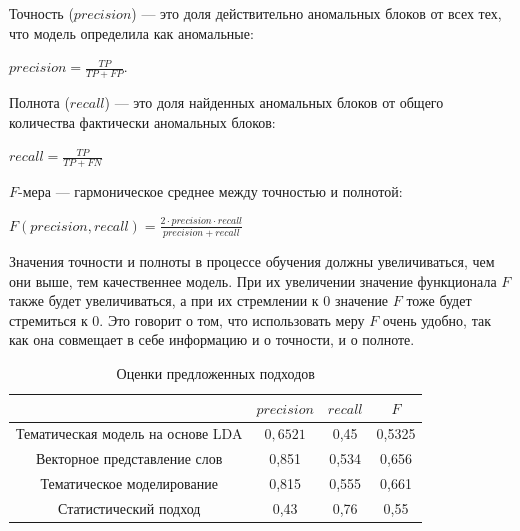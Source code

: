 \documentclass[14pt]{matmex-diploma-custom}
\newcommand{\nextline}{\tabularnewline\hline}
\begin{document}
\par\begin{itemize}{
		\vspace{-0.2cm}\item Точность ($precision$) --- это доля действительно аномальных блоков от всех тех, что модель определила как аномальные:
		
		\begin{center}
			$precision =  \frac{TP}{TP + FP}$.
		\end{center}
		
		\vspace{-0.2cm}\item Полнота ($recall$) --- это доля найденных аномальных блоков от общего количества фактически аномальных блоков:
		
		\begin{center}
			$recall = \frac{TP}{TP + FN}$ 
		\end{center}
		
		\vspace{-0.2cm}\item $F$-мера --- гармоническое среднее между точностью и полнотой:
		
		\begin{center}
			$F(precision, recall) =  \frac{2 \cdot precision \cdot recall}{precision + recall}$
		\end{center}
}\end{itemize}

Значения точности и полноты в процессе обучения должны увеличиваться, чем они выше, тем качественнее модель. При их увеличении значение функционала $F$ также будет увеличиваться, а при их стремлении к $0$ значение $F$ тоже будет стремиться к $0$. Это говорит о том, что использовать меру $F$ очень удобно, так как она совмещает в себе информацию и о точности, и о полноте.

\begin{table}[h]
	\centering
	\vspace{-0.5cm}
	\caption{Оценки предложенных подходов}
	\vspace{0.2cm}
	\label{table3}
	\begin{tabular}{|c|c|c|c|}
		\hline
		& $precision$ & $recall$ & $F$      \nextline 
		Тематическая модель на основе LDA                          & $0,6521$    & 0,45   & 0,5325 \nextline 
		Векторное представление слов & 0,851     & 0,534  & 0,656  \nextline 
		Тематическое моделирование   & 0,815     & 0,555  & 0,661  \nextline 
		Статистический подход        & 0,43      & 0,76   & 0,55  \nextline
	\end{tabular}
\end{table}
\end{document}
